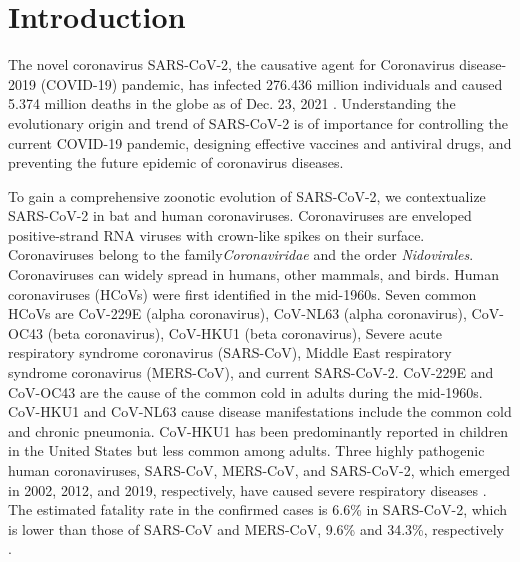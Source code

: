 \documentclass{article}
\numberwithin{equation}{section}
\begin{document}
\section{Introduction}
\label{Introduction}
The novel coronavirus SARS-CoV-2, the causative agent for Coronavirus disease-2019 (COVID-19) pandemic, has infected 276.436 million individuals and caused 5.374 million deaths in the globe as of Dec. 23, 2021 \citep{who_2021}. Understanding the evolutionary origin and trend of SARS-CoV-2 is of importance for controlling the current COVID-19 pandemic, designing effective vaccines and antiviral drugs, and preventing the future epidemic of coronavirus diseases. 

To gain a comprehensive zoonotic evolution of SARS-CoV-2, we contextualize SARS-CoV-2 in bat and human coronaviruses. Coronaviruses are enveloped positive-strand RNA viruses with crown-like spikes on their surface. Coronaviruses belong to the family\textit{Coronaviridae} and the order \textit{Nidovirales}. Coronaviruses can widely spread in humans, other mammals, and birds. Human coronaviruses (HCoVs) were first identified in the mid-1960s. Seven common HCoVs are CoV-229E (alpha coronavirus), CoV-NL63 (alpha coronavirus), CoV-OC43 (beta coronavirus), CoV-HKU1 (beta coronavirus), Severe acute respiratory syndrome coronavirus (SARS-CoV), Middle East respiratory syndrome coronavirus (MERS-CoV), and current SARS-CoV-2. CoV-229E and CoV-OC43 are the cause of the common cold in adults during the mid-1960s. CoV-HKU1 and CoV-NL63 cause disease manifestations include the common cold and chronic pneumonia. CoV-HKU1 has been predominantly reported in children in the United States but less common among adults. Three highly pathogenic human coronaviruses, SARS-CoV, MERS-CoV, and SARS-CoV-2, which emerged in 2002, 2012, and 2019, respectively, have caused severe respiratory diseases \citep{chen2020pathogenicity}. The estimated fatality rate in the confirmed cases is 6.6\% in SARS-CoV-2, which is lower than those of SARS-CoV and MERS-CoV, 9.6\% and 34.3\%, respectively \citep{wang2020novel}.
\end{document}
